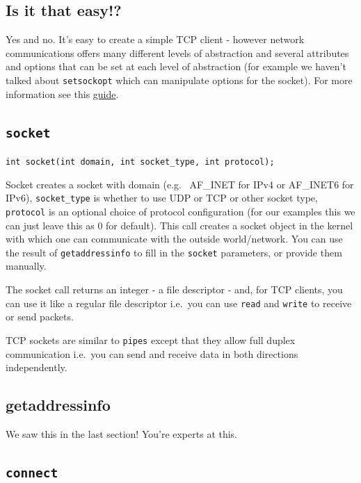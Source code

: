 \subsection{Is it that easy!?}\label{is-it-that-easy}

Yes and no. It's easy to create a simple TCP client - however network communications offers many different levels of abstraction and several attributes and options that can be set at each level of abstraction (for example we haven't talked about \texttt{setsockopt} which can manipulate options for the socket). For more information see this \href{http://www.beej.us/guide/bgnet/output/html/multipage/getaddrinfoman.html}{guide}.

\subsection{\texorpdfstring{\texttt{socket}}{socket}}\label{socket}

\texttt{int socket(int domain, int socket\_type, int protocol);}

Socket creates a socket with domain (e.g. ~AF\_INET for IPv4 or AF\_INET6 for IPv6), \texttt{socket\_type} is whether to use UDP or TCP or other socket type, \texttt{protocol} is an optional choice of protocol configuration (for our examples this we can just leave this as 0 for default). This call creates a socket object in the kernel with which one can communicate with the outside world/network. You can use the result of \texttt{getaddressinfo} to fill in the \texttt{socket} parameters, or provide them manually.

The socket call returns an integer - a file descriptor - and, for TCP clients, you can use it like a regular file descriptor i.e.~you can use \texttt{read} and \texttt{write} to receive or send packets.

TCP sockets are similar to \texttt{pipes} except that they allow full duplex communication i.e.~you can send and receive data in both directions independently.

\subsection{getaddressinfo}

We saw this in the last section! You're experts at this.

\subsection{\texttt{connect}}

